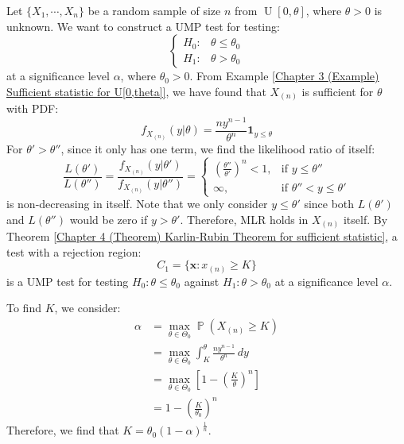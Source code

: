\documentclass{huhtakm-template-book-v2}
\DeclareMathOperator{\prob}{\mathbb{P}}
\DeclareMathOperator{\U}{U}
\begin{document}
\begin{eg}
	Let $\{X_{1},\cdots,X_{n}\}$ be a random sample of size $n$ from $\U[0,\theta]$, where $\theta>0$ is unknown. We want to construct a UMP test for testing:
	\begin{equation*}
		\begin{cases}
			H_{0}: &\theta\leq\theta_{0}\\
			H_{1}: &\theta>\theta_{0}
		\end{cases}
	\end{equation*}
	at a significance level $\alpha$, where $\theta_{0}>0$. From Example \ref{Chapter 3 (Example) Sufficient statistic for U[0,theta]}, we have found that $X_{(n)}$ is sufficient for $\theta$ with PDF:
	\begin{equation*}
		f_{X_{(n)}}(y|\theta)=\frac{ny^{n-1}}{\theta^{n}}\mathbf{1}_{y\leq\theta}
	\end{equation*}
	For $\theta'>\theta''$, since it only has one term, we find the likelihood ratio of itself:
	\begin{equation*}
		\frac{L(\theta')}{L(\theta'')}=\frac{f_{X_{(n)}}(y|\theta')}{f_{X_{(n)}}(y|\theta'')}=\begin{cases}
			\left(\frac{\theta''}{\theta'}\right)^{n}<1, &\text{if } y\leq\theta''\\
			\infty, &\text{if } \theta''<y\leq\theta'
		\end{cases}
	\end{equation*}
	is non-decreasing in itself. Note that we only consider $y\leq\theta'$ since both $L(\theta')$ and $L(\theta'')$ would be zero if $y>\theta'$. Therefore, MLR holds in $X_{(n)}$ itself. By Theorem \ref{Chapter 4 (Theorem) Karlin-Rubin Theorem for sufficient statistic}, a test with a rejection region:
	\begin{equation*}
		C_{1}=\{\mathbf{x}:x_{(n)}\geq K\}
	\end{equation*}
	is a UMP test for testing $H_{0}:\theta\leq\theta_{0}$ against $H_{1}:\theta>\theta_{0}$ at a significance level $\alpha$.
	
	To find $K$, we consider:
	\begin{align*}
		\alpha&=\max_{\theta\in\Theta_{0}}\prob(X_{(n)}\geq K)\\
		&=\max_{\theta\in\Theta_{0}}\int_{K}^{\theta}\frac{ny^{n-1}}{\theta^{n}}\,dy\\
		&=\max_{\theta\in\Theta_{0}}\left[1-\left(\frac{K}{\theta}\right)^{n}\right]\\
		&=1-\left(\frac{K}{\theta_{0}}\right)^{n}
	\end{align*}
	Therefore, we find that $K=\theta_{0}\left(1-\alpha\right)^{\frac{1}{n}}$.
\end{eg}
\end{document}
